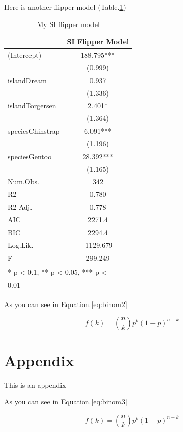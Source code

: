 \documentclass[
]{article}
\begin{document}
Here is another flipper model (Table.\ref{tab:si-flipper-model})

\begin{table}

\caption{\label{tab:si-flipper-model}My SI flipper model}
\centering
\begin{tabular}[t]{lc}
\toprule
  & SI Flipper Model\\
\midrule
(Intercept) & 188.795***\\
 & (0.999)\\
islandDream & 0.937\\
 & (1.336)\\
islandTorgersen & 2.401*\\
 & (1.364)\\
speciesChinstrap & 6.091***\\
 & (1.196)\\
speciesGentoo & 28.392***\\
 & (1.165)\\
\midrule
Num.Obs. & 342\\
R2 & 0.780\\
R2 Adj. & 0.778\\
AIC & 2271.4\\
BIC & 2294.4\\
Log.Lik. & -1129.679\\
F & 299.249\\
\bottomrule
\multicolumn{2}{l}{\textsuperscript{} * p < 0.1, ** p < 0.05, *** p <}\\
\multicolumn{2}{l}{0.01}\\
\end{tabular}
\end{table}

As you can see in Equation.\eqref{eq:binom2}

\begin{equation} 
  f\left(k\right) = \binom{n}{k} p^k\left(1-p\right)^{n-k}
  \label{eq:binom2}
\end{equation}

\newpage

\hypertarget{appendix}{%
\section{Appendix}\label{appendix}}

\renewcommand{\thefigure}{A\arabic{figure}}

\setcounter{figure}{0}

\renewcommand{\thetable}{A\arabic{table}}

\setcounter{table}{0}

\renewcommand{\theequation}{A\arabic{equation}}

\setcounter{equation}{0}

This is an appendix

As you can see in Equation.\eqref{eq:binom3}

\begin{equation} 
  f\left(k\right) = \binom{n}{k} p^k\left(1-p\right)^{n-k}
  \label{eq:binom3}
\end{equation}
\end{document}
